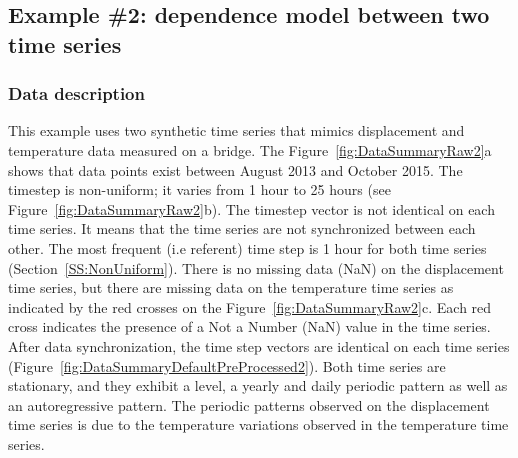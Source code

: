 \subsection{Example \#2: dependence model between two time series}
\label{S:ExampleDispTemp}

\subsubsection{Data description}

This example uses two synthetic time series that mimics displacement and temperature data measured on a bridge.
The  Figure~\ref{fig:DataSummaryRaw2}a shows that data points exist between August 2013 and October 2015.
The timestep is non-uniform; it varies from 1 hour to 25 hours (see Figure~\ref{fig:DataSummaryRaw2}b). 
The timestep vector is not identical on each time series. 
It means that the time series are not synchronized between each other.
The most frequent (i.e referent) time step is 1 hour for both time series (Section~\ref{SS:NonUniform}).
There is no missing data (NaN) on the displacement time series, but there are missing data on the temperature time series as indicated by the red crosses on the Figure~\ref{fig:DataSummaryRaw2}c.
Each red cross indicates the presence of a Not a Number (NaN) value in the time series.
After data synchronization, the time step vectors are identical on each time series (Figure~\ref{fig:DataSummaryDefaultPreProcessed2}).
Both time series are stationary, and they exhibit a level, a yearly and daily periodic pattern as well as an autoregressive pattern.
The periodic patterns observed on the displacement time series is due to the temperature variations observed in the temperature time series.

